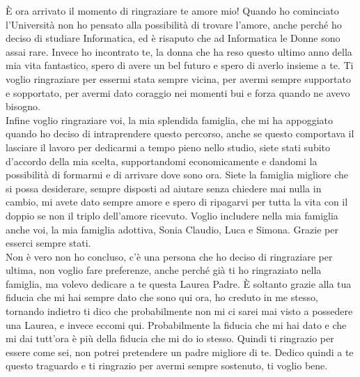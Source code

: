 \`E ora arrivato il momento di ringraziare te amore mio! Quando ho cominciato l'Universit\`a non ho pensato alla possibilit\`a di trovare l'amore, anche perch\'e ho deciso di studiare Informatica, ed \`e risaputo che ad Informatica le Donne sono assai rare. Invece ho incontrato te, la donna che ha reso questo ultimo anno della mia vita fantastico, spero di avere un bel futuro e spero di averlo insieme a te. Ti voglio ringraziare per essermi stata sempre vicina, per avermi sempre supportato e sopportato, per avermi dato coraggio nei momenti bui e forza quando ne avevo bisogno.\\
Infine voglio ringraziare voi, la mia splendida famiglia, che mi ha appoggiato quando ho deciso di intraprendere questo percorso, anche se questo comportava il lasciare il lavoro per dedicarmi a tempo pieno nello studio, siete stati subito d'accordo della mia scelta, supportandomi economicamente e dandomi la possibilit\`a di formarmi e di arrivare dove sono ora. Siete la famiglia migliore che si possa desiderare, sempre disposti ad aiutare senza chiedere mai nulla in cambio, mi avete dato sempre amore e spero di ripagarvi per tutta la vita con il doppio se non il triplo dell'amore ricevuto. Voglio includere nella mia famiglia anche voi, la mia famiglia adottiva, Sonia Claudio, Luca e Simona. Grazie per esserci sempre stati.\\
Non \`e vero non ho concluso, c'\`e una persona che ho deciso di ringraziare per ultima, non voglio fare preferenze, anche perch\'e gi\`a ti ho ringraziato nella famiglia, ma volevo dedicare a te questa Laurea Padre. \`E soltanto grazie alla tua fiducia che mi hai sempre dato che sono qui ora, ho creduto in me stesso, tornando indietro ti dico che probabilmente non mi ci sarei mai visto a possedere una Laurea, e invece eccomi qui. Probabilmente la fiducia che mi hai dato e che mi dai tutt'ora \`e pi\`u della fiducia che mi do io stesso. Quindi ti ringrazio per essere come sei, non potrei pretendere un padre migliore di te. Dedico quindi a te questo traguardo e ti ringrazio per avermi sempre sostenuto, ti voglio bene.